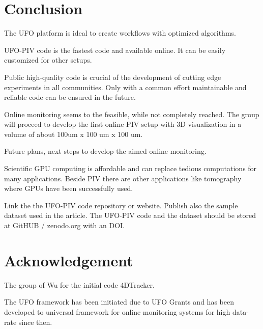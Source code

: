 \section{Conclusion}



The UFO platform is ideal to create workflows with optimized algorithms. 



UFO-PIV code is the fastest code and available online. It can be easily customized for other setups. 



Public high-quality code is crucial of the development of cutting edge experiments in all communities. Only with a common effort maintainable and reliable code can be ensured in the future. 



Online monitoring seems to the feasible, while not completely reached. The group will proceed to develop the first online PIV setup with 3D visualization in a volume of about 100um x 100 um x 100 um.



Future plans, next steps to develop the aimed online monitoring.

 

Scientific GPU computing is affordable and can replace tedious computations for many applications. Beside PIV there are other applications like tomography where GPUs have been successfully used.



Link the the UFO-PIV code repository or website. Publish also the sample dataset used in the article. The UFO-PIV code and the dataset should be stored at GitHUB / zenodo.org with an DOI.







\section{Acknowledgement}



The group of Wu for the initial code 4DTracker.



The UFO framework has been initiated due to UFO Grants and has been developed to universal framework for online monitoring systems for high data-rate since then.





